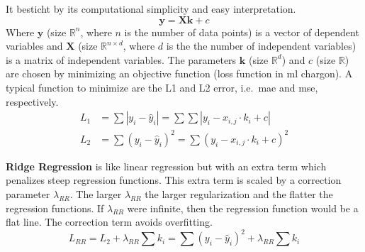 It besticht by its computational simplicity and easy interpretation. 
\begin{equation}
\mathbf{y} = \mathbf{X} \mathbf{k} +c 
\end{equation}
Where $\mathbf{y}$ (size $\mathbb{R}^n$, where $n$ is the number of data points) is a vector of dependent variables and $\mathbf{X}$ (size $\mathbb{R}^{n\times d}$, where $d$ is the the number of independent variables) is a matrix of independent variables. 
The parameters $\mathbf{k}$ (size $\mathbb{R}^d$) and $c$ (size $\mathbb{R}$) are chosen by minimizing an objective function (loss function in \gls{ml} chargon).
A typical function to minimize are the L1 and L2 error, i.e.\ \gls{mae} and \gls{mse}, respectively.
\begin{align}
L_1&= \sum |y_i - \hat y_i| = \sum \sum |y_i - x_{i,j}\cdot k_i+c| \\
L_2&= \sum(y_i - \hat y_i)^2 = \sum (y_i - x_{i,j}\cdot k_i+c)^2
\end{align}
%

\textbf{Ridge Regression} is like linear regression but with an extra term which penalizes steep regression functions.
This extra term is scaled by a correction parameter $\lambda_{RR}$. 
The larger $\lambda_{RR}$ the larger regularization and the flatter the regression functions. 
If $\lambda_{RR}$ were infinite, then the regression function would be a flat line. 
The correction term avoids overfitting. 
\begin{equation}
	L_{RR} = L_2 + \lambda_{RR} \sum k_i = \sum(y_i - \hat y_i)^2 + \lambda_{RR} \sum k_i
\end{equation}

